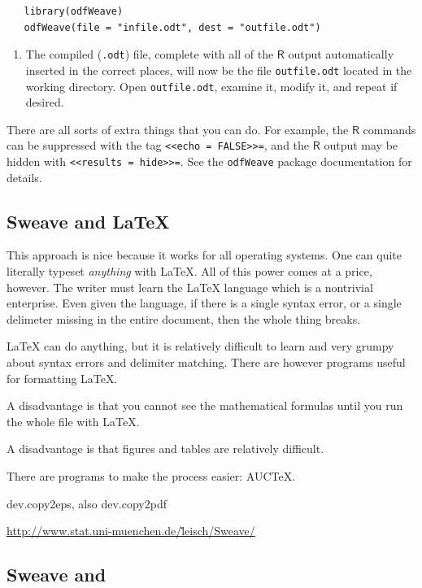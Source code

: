 \documentclass[captions=tableheading]{scrbook}
\begin{document}
\begin{example}
\begin{verbatim}
   library(odfWeave)
   odfWeave(file = "infile.odt", dest = "outfile.odt")
\end{verbatim}
\begin{enumerate}
\item The compiled (\texttt{.odt}) file, complete with all of the \(\mathsf{R}\) output automatically inserted in the correct places, will now be the file \texttt{outfile.odt} located in the working directory. Open \texttt{outfile.odt}, examine it, modify it, and repeat if desired.
\end{enumerate}

There are all sorts of extra things that you can do. For example, the \(\mathsf{R}\) commands can be suppressed with the tag \texttt{<\textcompwordmark{}<echo = FALSE>\textcompwordmark{}>=}, and the \(\mathsf{R}\) output may be hidden with \texttt{<\textcompwordmark{}<results = hide>\textcompwordmark{}>=}. See the \texttt{odfWeave} package documentation for details.
\subsection{Sweave and \protect\LaTeX{}}
\label{sec-22-2-3}


This approach is nice because it works for all operating systems. One can quite literally typeset \emph{anything} with \LaTeX{}. All of this power comes at a price, however. The writer must learn the \LaTeX{} language which is a nontrivial enterprise. Even given the language, if there is a single syntax error, or a single delimeter missing in the entire document, then the whole thing breaks.

\LaTeX{} can do anything, but it is relatively difficult to learn  and very grumpy about syntax errors and delimiter matching. There are however programs useful for formatting \LaTeX{}.

A disadvantage is that you cannot see the mathematical formulas until you run the whole file with \LaTeX{}.

A disadvantage is that figures and tables are relatively difficult.

There are programs to make the process easier: AUC\TeX{}.

dev.copy2eps, also dev.copy2pdf

\href{http://www.stat.uni-muenchen.de/~leisch/Sweave/}{http://www.stat.uni-muenchen.de/\~leisch/Sweave/}
\subsection{Sweave and \protect\LyX{}}
\label{sec-22-2-4}


\end{example}
\end{document}
